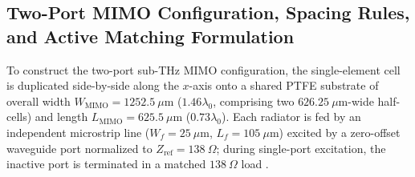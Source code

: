 \documentclass[referee,pdflatex,sn-mathphys-ay]{sn-jnl}
\begin{document}

\subsection{Two-Port MIMO Configuration, Spacing Rules, and Active Matching Formulation}
\label{subsec:two_port_mimo}

To construct the two-port sub-THz MIMO configuration, the single-element cell is duplicated side-by-side along the $x$-axis onto a shared PTFE substrate of overall width $W_{\mathrm{MIMO}} = 1252.5~\mu\mathrm{m}$ ($1.46\lambda_0$, comprising two $626.25~\mu\mathrm{m}$-wide half-cells) and length $L_{\mathrm{MIMO}} = 625.5~\mu\mathrm{m}$ ($0.73\lambda_0$). Each radiator is fed by an independent microstrip line ($W_f = 25~\mu\mathrm{m}$, $L_f = 105~\mu\mathrm{m}$) excited by a zero-offset waveguide port normalized to \(Z_{\mathrm{ref}}=138~\Omega\); during single-port excitation, the inactive port is terminated in a matched \(138~\Omega\) load \citep{MIMOReview2022}.
\end{document}
